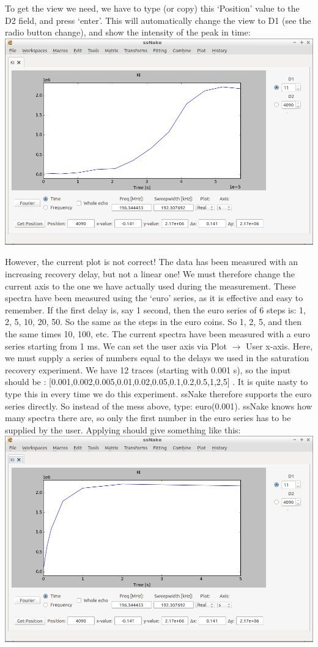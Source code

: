 \documentclass[11pt,a4paper]{article}
\begin{document}
To get the view we need, we have to type (or copy) this `Position' value to the D2 field, and press `enter'. This will automatically change the view to D1 (see the radio button change), and show the intensity of the peak in time:\\
\includegraphics[width=\linewidth]{Images/T1.png}

However, the  current plot is not correct! The data has been measured with an increasing recovery delay, but not a linear one! We must therefore change the current axis to the one we have actually used during the measurement. These spectra have been measured using the `euro' series, as it is effective and easy to remember. If the first delay is, say 1 second, then the euro series of 6 steps is: 1, 2, 5, 10, 20, 50. So the same as the steps in the euro coins. So 1, 2, 5, and then the same times 10, 100, etc. The current spectra have been measured with a euro series starting from 1 ms. We can set the user axis via Plot $\rightarrow$ User x-axis. Here, we must supply a series of numbers equal to the delays we used in the saturation recovery experiment. We have 12 traces (starting with 0.001 s), so the input should be : [0.001,0.002,0.005,0.01,0.02,0.05,0.1,0.2,0.5,1,2,5] . It is quite nasty to type this in every time we do this experiment. ssNake therefore supports the euro series directly. So instead of the mess above, type: euro(0.001). ssNake knows how many spectra there are, so only the first number in the euro series has to be supplied by the user. Applying should give something like this:\\
\includegraphics[width=\linewidth]{Images/T1correctAxis.png}
\end{document}
